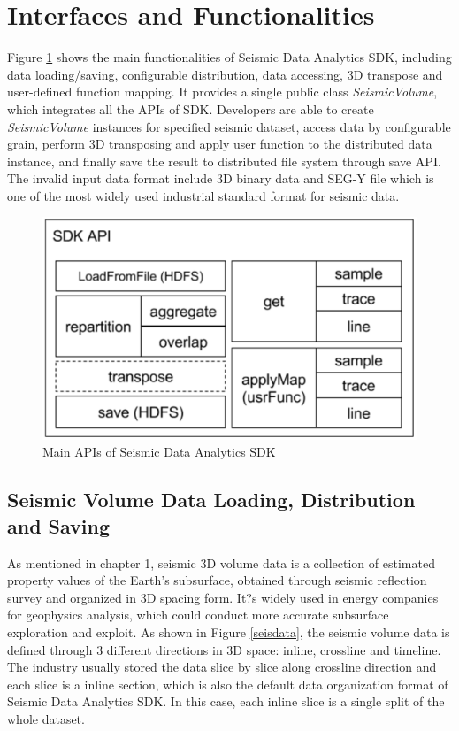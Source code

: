 \section{Interfaces and Functionalities}

Figure \ref{sdk_interface} shows the main functionalities of Seismic Data Analytics SDK, including data loading/saving, configurable distribution, data accessing, 3D transpose and user-defined function mapping. It provides a single public class \emph{SeismicVolume}, which integrates all the APIs of SDK. Developers are able to create \emph{SeismicVolume} instances for specified seismic dataset, access data by configurable grain, perform 3D transposing and apply user function to the distributed data instance, and finally save the result to distributed file system through save API. The invalid input data format include 3D binary data and SEG-Y file \cite{SEGDREV21} which is one of the most widely used industrial standard format for seismic data.

\begin{figure}[h]
\centering
\includegraphics[scale=0.6]{figures/sdk_interface.png}
\caption{Main APIs of Seismic Data Analytics SDK}
\label{sdk_interface}
\end{figure}

\subsection{Seismic Volume Data Loading, Distribution and Saving}

As mentioned in chapter 1, seismic 3D volume data is a collection of estimated property values of the Earth's subsurface, obtained through seismic reflection survey and organized in 3D spacing form. It?s widely used in energy companies for geophysics analysis, which could conduct more accurate subsurface exploration and exploit. As shown in Figure \ref{seisdata}, the seismic volume data is defined through 3 different directions in 3D space: inline, crossline and timeline. The industry usually stored the data slice by slice along crossline direction and each slice is a inline section, which is also the default data organization format of Seismic Data Analytics SDK. In this case, each inline slice is a single split of the whole dataset.

